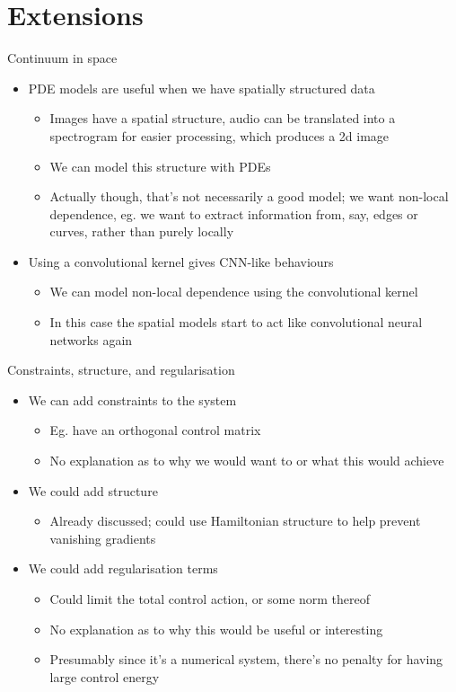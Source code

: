 \documentclass[presentation]{beamer}
\begin{document}
\section{Extensions}
\label{sec:org3ce856d}
\begin{frame}[label={sec:org15cb75b},plain]{Continuum in space}
\begin{itemize}
\item PDE models are useful when we have spatially structured data
\begin{itemize}
\item Images have a spatial structure, audio can be translated into a spectrogram for easier processing, which produces a 2d image
\item We can model this structure with PDEs
\item Actually though, that's not necessarily a good model; we want non-local dependence, eg. we want to extract information from, say, edges or curves, rather than purely locally
\end{itemize}

\item Using a convolutional kernel gives CNN-like behaviours
\begin{itemize}
\item We can model non-local dependence using the convolutional kernel
\item In this case the spatial models start to act like convolutional neural networks again
\end{itemize}
\end{itemize}
\end{frame}

\begin{frame}[label={sec:org15274f6},plain]{Constraints, structure, and regularisation}
\begin{itemize}
\item We can add constraints to the system
\begin{itemize}
\item Eg. have an orthogonal control matrix
\item No explanation as to why we would want to or what this would achieve
\end{itemize}

\item We could add structure
\begin{itemize}
\item Already discussed; could use Hamiltonian structure to help prevent vanishing gradients
\end{itemize}

\item We could add regularisation terms
\begin{itemize}
\item Could limit the total control action, or some norm thereof
\item No explanation as to why this would be useful or interesting
\item Presumably since it's a numerical system, there's no penalty for having large control energy
\end{itemize}
\end{itemize}
\end{frame}
\end{document}
